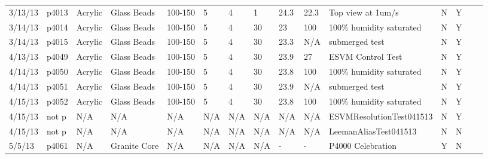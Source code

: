 \begin{landscape}
\begin{longtable}{lllllllllllllll}
3/13/13  & p4013      & Acrylic          & Glass Beads  & 100-150      & 5         & 4             & 1                            & 24.3        & 22.3     & Top view at 1um/s                               & N     & Y    &  &  \\
3/14/13  & p4014      & Acrylic          & Glass Beads  & 100-150      & 5         & 4             & 30                           & 23          & 100      & 100\% humidity saturated                        & N     & Y    &  &  \\
3/14/13  & p4015      & Acrylic          & Glass Beads  & 100-150      & 5         & 4             & 30                           & 23.3        & N/A      & submerged test                                  & N     & Y    &  &  \\
4/13/13  & p4049      & Acrylic          & Glass Beads  & 100-150      & 5         & 4             & 30                           & 23.9        & 27       & ESVM Control Test                               & N     & Y    &  &  \\
4/14/13  & p4050      & Acrylic          & Glass Beads  & 100-150      & 5         & 4             & 30                           & 23.8        & 100      & 100\% humidity saturated                        & N     & Y    &  &  \\
4/14/13  & p4051      & Acrylic          & Glass Beads  & 100-150      & 5         & 4             & 30                           & 23.9        & N/A      & submerged test                                  & N     & Y    &  &  \\
4/15/13  & p4052      & Acrylic          & Glass Beads  & 100-150      & 5         & 4             & 30                           & 23.8        & 100      & 100\% humidity saturated                        & N     & Y    &  &  \\
4/15/13  & not p      & N/A              & N/A          & N/A          & N/A       & N/A           & N/A                          & N/A         & N/A      & ESVMResolutionTest041513                        & N     & Y    &  &  \\
4/15/13  & not p      & N/A              & N/A          & N/A          & N/A       & N/A           & N/A                          & N/A         & N/A      & LeemanAliasTest041513                           & N     & N    &  &  \\
5/5/13   & p4061      & N/A              & Granite Core & N/A          & N/A       & N/A           & N/A                          & -           & -        & P4000 Celebration                               & Y     & N    &  &  \\

\end{longtable}
\end{landscape}
